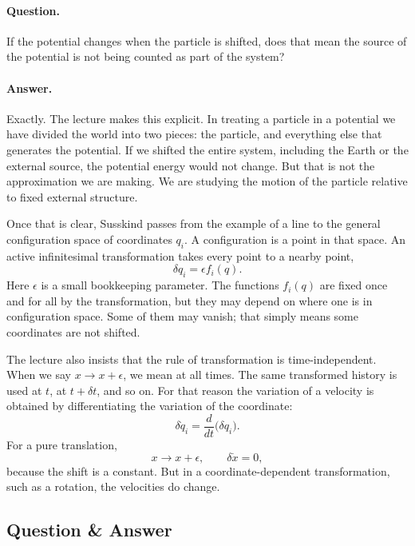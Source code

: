 \paragraph{Question.} If the potential changes when the particle is shifted, does that mean the source of the potential is not being counted as part of the system?

\paragraph{Answer.} Exactly. The lecture makes this explicit. In treating a particle in a potential we have divided the world into two pieces: the particle, and everything else that generates the potential. If we shifted the entire system, including the Earth or the external source, the potential energy would not change. But that is not the approximation we are making. We are studying the motion of the particle relative to fixed external structure.

Once that is clear, Susskind passes from the example of a line to the general configuration space of coordinates \(q_i\). A configuration is a point in that space. An active infinitesimal transformation takes every point to a nearby point,
\begin{equation}
\delta q_i=\epsilon f_i(q).
\end{equation}
Here \(\epsilon\) is a small bookkeeping parameter. The functions \(f_i(q)\) are fixed once and for all by the transformation, but they may depend on where one is in configuration space. Some of them may vanish; that simply means some coordinates are not shifted.

The lecture also insists that the rule of transformation is time-independent. When we say \(x\to x+\epsilon\), we mean at all times. The same transformed history is used at \(t\), at \(t+\delta t\), and so on. For that reason the variation of a velocity is obtained by differentiating the variation of the coordinate:
\begin{equation}
\delta \dot q_i=\frac{d}{dt}\bigl(\delta q_i\bigr).
\end{equation}
For a pure translation,
\begin{equation}
x\to x+\epsilon,
\qquad
\delta \dot x=0,
\end{equation}
because the shift is a constant. But in a coordinate-dependent transformation, such as a rotation, the velocities do change.

\subsection{Question \& Answer}


